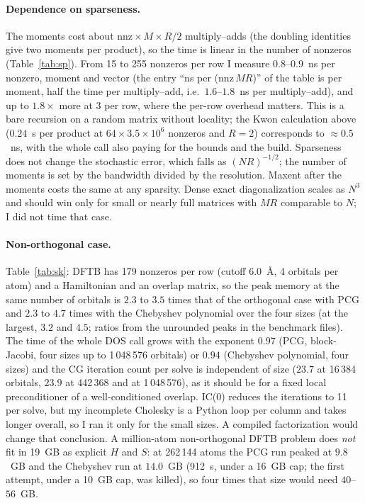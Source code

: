 \documentclass[reprint,nofootinbib,superscriptaddress,amsmath,amssymb,aps,prb,floatfix]{revtex4-2}
\begin{document}
\paragraph*{Dependence on sparseness.}
The moments cost about $\mathrm{nnz}\times M\times R/2$ multiply--adds (the doubling identities give two moments per product), so the time is linear in the number of nonzeros (Table~\ref{tab:sp}). From 15 to 255 nonzeros per row I measure $0.8$--$0.9$~ns per nonzero, moment and vector (the entry ``ns per ($\mathrm{nnz}\,MR$)'' of the table is per moment, half the time per multiply--add, i.e.\ $1.6$--$1.8$~ns per multiply--add), and up to $1.8\times$ more at 3 per row, where the per-row overhead matters.
This is a bare recursion on a random matrix without locality; the Kwon calculation above ($0.24$~s per product at $64\times3.5\times10^6$ nonzeros and $R=2$) corresponds to $\approx0.5$~ns, with the whole call also paying for the bounds and the build.
Sparseness does not change the stochastic error, which falls as $(NR)^{-1/2}$; the number of moments is set by the bandwidth divided by the resolution.
Maxent after the moments costs the same at any sparsity.
Dense exact diagonalization scales as $N^3$ and should win only for small or nearly full matrices with $MR$ comparable to $N$; I did not time that case.



\paragraph*{Non-orthogonal case.}
Table~\ref{tab:sk}: DFTB has 179 nonzeros per row (cutoff 6.0~\AA, 4 orbitals per atom) and a Hamiltonian and an overlap matrix, so the peak memory at the same number of orbitals is $2.3$ to $3.5$ times that of the orthogonal case with PCG and $2.3$ to $4.7$ times with the Chebyshev polynomial over the four sizes (at the largest, $3.2$ and $4.5$; ratios from the unrounded peaks in the benchmark files).
The time of the whole DOS call grows with the exponent $0.97$ (PCG, block-Jacobi, four sizes up to 1\,048\,576 orbitals) or $0.94$ (Chebyshev polynomial, four sizes) and the CG iteration count per solve is independent of size ($23.7$ at 16\,384 orbitals, $23.9$ at 442\,368 and at 1\,048\,576), as it should be for a fixed local preconditioner of a well-conditioned overlap.
IC(0) reduces the iterations to 11 per solve, but my incomplete Cholesky is a Python loop per column and takes longer overall, so I ran it only for the small sizes. A compiled factorization would change that conclusion.
A million-atom non-orthogonal DFTB problem does \emph{not} fit in 19~GB as explicit $H$ and $S$: at 262\,144 atoms the PCG run peaked at $9.8$~GB and the Chebyshev run at $14.0$~GB (912~s, under a 16~GB cap; the first attempt, under a 10~GB cap, was killed), so four times that size would need $40$--$56$~GB.
\end{document}
